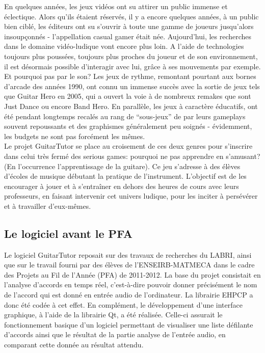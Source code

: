 \documentclass[a4paper,11pt]{article}
\begin{document}
En quelques années, les jeux vidéos ont su attirer un public immense et éclectique. Alors qu'ils étaient réservés, il y a encore quelques années, à un public bien ciblé, les éditeurs ont su s'ouvrir à toute une gamme de joueurs jusqu'alors insoupçonnés - l'appellation casual gamer était née. Aujourd'hui, les recherches dans le domaine vidéo-ludique vont encore plus loin. A l'aide de technologies toujours plus poussées, toujours plus proches du joueur et de son environnement, il est désormais possible d'interagir avec lui, grâce à ses mouvements par exemple. Et pourquoi pas par le son? Les jeux de rythme, remontant pourtant aux bornes d'arcade des années 1990, ont connu un immense succès avec la sortie de jeux tels que Guitar Hero en 2005, qui a ouvert la voie à de nombreux remakes que sont Just Dance ou encore Band Hero. En parallèle, les jeux à caractère éducatifs, ont été pendant longtemps recalés au rang de “sous-jeux” de par leurs gameplays souvent repoussants et des graphismes généralement peu soignés - 
évidemment, les budgets ne sont pas forcément les mêmes.\\

Le projet GuitarTutor se place au croisement de ces deux genres pour s'inscrire dans celui très fermé des serious games: pourquoi ne pas apprendre en s'amusant? (En l'occurrence l'apprentissage de la guitare). Ce jeu s'adresse à des élèves d'écoles de musique débutant la pratique de l'instrument. L'objectif est de les encourager à jouer et à s'entraîner en dehors des heures de cours avec leurs professeurs, en faisant intervenir cet univers ludique, pour les inciter à persévérer et à travailler d'eux-mêmes.

\subsection*{Le logiciel avant le PFA}

Le logiciel GuitarTutor reposait sur des travaux de recherches du LABRI, ainsi que sur le travail fourni par des élèves de l'ENSEIRB-MATMECA dans le cadre des Projets au Fil de l'Année (PFA) de 2011-2012. La base du projet consistait en l'analyse d'accords en temps réel, c'est-à-dire pouvoir donner précisément le nom de l'accord qui est donné en entrée audio de l'ordinateur. La librairie EHPCP a donc été codée à cet effet. En complément, le développement d'une interface graphique, à l'aide de la librairie Qt, a été réalisée. Celle-ci assurait le fonctionnement basique d'un logiciel permettant de visualiser une liste défilante d'accords ainsi que le résultat de la partie analyse de l'entrée audio, en comparant cette donnée au résultat attendu.\\
\end{document}
